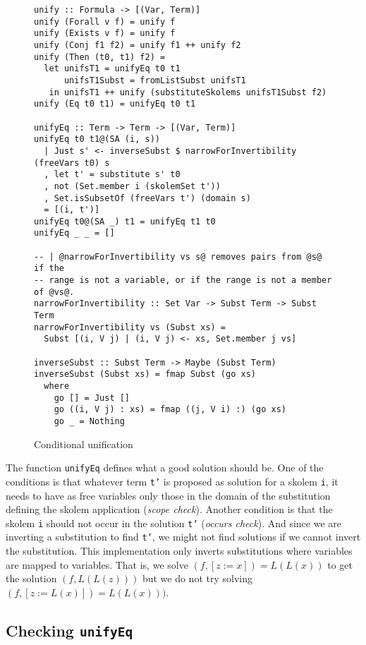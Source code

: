 \documentclass[acmtog, anonymous]{acmart}
\newcommand{\tc}[1]{{\small\texttt{#1}}}
\begin{document}
\begin{figure}
\begin{verbatim}
unify :: Formula -> [(Var, Term)]
unify (Forall v f) = unify f
unify (Exists v f) = unify f
unify (Conj f1 f2) = unify f1 ++ unify f2
unify (Then (t0, t1) f2) =
  let unifsT1 = unifyEq t0 t1
      unifsT1Subst = fromListSubst unifsT1
   in unifsT1 ++ unify (substituteSkolems unifsT1Subst f2)
unify (Eq t0 t1) = unifyEq t0 t1

unifyEq :: Term -> Term -> [(Var, Term)]
unifyEq t0 t1@(SA (i, s))
  | Just s' <- inverseSubst $ narrowForInvertibility (freeVars t0) s
  , let t' = substitute s' t0
  , not (Set.member i (skolemSet t'))
  , Set.isSubsetOf (freeVars t') (domain s)
  = [(i, t')]
unifyEq t0@(SA _) t1 = unifyEq t1 t0
unifyEq _ _ = []

-- | @narrowForInvertibility vs s@ removes pairs from @s@ if the
-- range is not a variable, or if the range is not a member of @vs@.
narrowForInvertibility :: Set Var -> Subst Term -> Subst Term
narrowForInvertibility vs (Subst xs) =
  Subst [(i, V j) | (i, V j) <- xs, Set.member j vs]

inverseSubst :: Subst Term -> Maybe (Subst Term)
inverseSubst (Subst xs) = fmap Subst (go xs)
  where
    go [] = Just []
    go ((i, V j) : xs) = fmap ((j, V i) :) (go xs)
    go _ = Nothing
\end{verbatim}
\caption{Conditional unification}
\label{conditional-unification}
\end{figure}

The function \tc{unifyEq} defines what a good solution should be.
One of the conditions is that whatever term \tc{t'} is proposed
as solution for a skolem \tc{i}, it needs to have as free variables only those in the
domain of the substitution defining the skolem application
(\textit{scope check}). Another
condition is that the skolem \tc{i} should not occur in the solution
\tc{t'} (\textit{occurs check}). And since we are inverting a substitution to find
\tc{t'}, we might not find solutions if we cannot invert the
substitution. This implementation only inverts substitutions where
variables are mapped to variables. That is, we solve $(f, [z:=x]) = L(L(x))$
to get the solution $(f, L(L(z)))$ but we do not try solving $(f, [z:=L(x)]) = L(L(x)))$.

\subsection{Checking \tc{unifyEq}}
\end{document}
